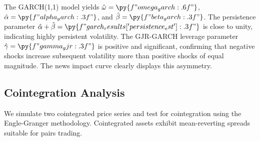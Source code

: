 \documentclass[a4paper, 11pt]{article}
\begin{document}
The GARCH(1,1) model yields $\hat{\omega} = \py{f"{omega_garch:.6f}"}$,
$\hat{\alpha} = \py{f"{alpha_garch:.3f}"}$, and $\hat{\beta} = \py{f"{beta_garch:.3f}"}$.
The persistence parameter $\hat{\alpha} + \hat{\beta} = \py{f"{garch_results['persistence_est']:.3f}"}$
is close to unity, indicating highly persistent volatility. The GJR-GARCH leverage parameter
$\hat{\gamma} = \py{f"{gamma_gjr:.3f}"}$ is positive and significant, confirming that negative
shocks increase subsequent volatility more than positive shocks of equal magnitude. The news
impact curve clearly displays this asymmetry.

\subsection{Cointegration Analysis}

We simulate two cointegrated price series and test for cointegration using the Engle-Granger
methodology. Cointegrated assets exhibit mean-reverting spreads suitable for pairs trading.
\end{document}
